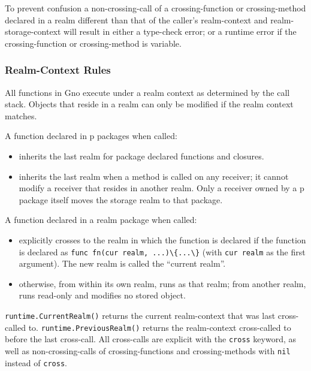 \documentclass[12pt,a4paper]{article}
\providecommand{\tightlist}{\setlength{\itemsep}{0pt}\setlength{\parskip}{0pt}}
\newcommand{\passthrough}[1]{#1}
\begin{document}
To prevent confusion a non-crossing-call of a crossing-function or
crossing-method declared in a realm different than that of the caller's
realm-context and realm-storage-context will result in either a
type-check error; or a runtime error if the crossing-function or
crossing-method is variable.

\subsubsection{Realm-Context Rules}\label{realm-context-rules}

All functions in Gno execute under a realm context as determined by the
call stack. Objects that reside in a realm can only be modified if the
realm context matches.

A function declared in p packages when called:

\begin{itemize}
\tightlist
\item
  inherits the last realm for package declared functions and closures.
\item
  inherits the last realm when a method is called on any receiver; it
  cannot modify a receiver that resides in another realm. Only a
  receiver owned by a p package itself moves the storage realm to that
  package.
\end{itemize}

A function declared in a realm package when called:

\begin{itemize}
\tightlist
\item
  explicitly crosses to the realm in which the function is declared if
  the function is declared as
  \passthrough{\lstinline!func fn(cur realm, ...)\{...\}!} (with
  \passthrough{\lstinline!cur realm!} as the first argument). The new
  realm is called the ``current realm''.
\item
  otherwise, from within its own realm, runs as that realm; from
  another realm, runs read-only and modifies no stored object.
\end{itemize}

\passthrough{\lstinline!runtime.CurrentRealm()!} returns the current
realm-context that was last cross-called to.
\passthrough{\lstinline!runtime.PreviousRealm()!} returns the
realm-context cross-called to before the last cross-call. All
cross-calls are explicit with the \passthrough{\lstinline!cross!}
keyword, as well as non-crossing-calls of crossing-functions and
crossing-methods with \passthrough{\lstinline!nil!} instead of
\passthrough{\lstinline!cross!}.
\end{document}
